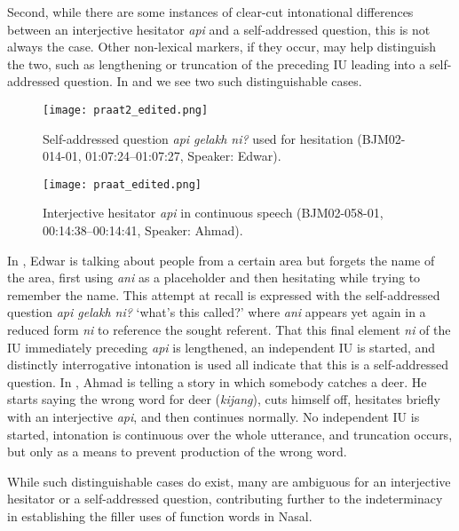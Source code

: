 \documentclass[output=paper,colorlinks,citecolor=brown
\ChapterDOI{10.5281/zenodo.15697585}
]{langscibook}
\begin{document}
Second, while there are some instances of clear-cut intonational differences between an interjective hesitator \textit{api} and a self-addressed question, this is not always the case. Other non-lexical markers, if they occur, may help distinguish the two, such as lengthening or truncation of the preceding IU leading into a self-addressed question. In  and  we see two such distinguishable cases.

        \begin{figure}
            \texttt{[image: praat2\_edited.png]}
            \caption{Self-addressed question \textit{api gelakh ni?} used for hesitation (BJM02-014-01, 01:07:24–01:07:27, Speaker: Edwar).}
            \label{fig:spect-ques}
        \end{figure}
        
        \begin{figure}
            \texttt{[image: praat\_edited.png]}
            \caption{Interjective hesitator \textit{api} in continuous speech (BJM02-058-01, 00:14:38–00:14:41, Speaker: Ahmad).}
            \label{fig:spect-hes}
        \end{figure}

In , Edwar is talking about people from a certain area but forgets the name of the area, first using \textit{ani} as a placeholder and then hesitating while trying to remember the name. This attempt at recall is expressed with the self-addressed question \textit{api gelakh ni?} `what's this called?' where \textit{ani} appears yet again in a reduced form \textit{ni} to reference the sought referent. That this final element \textit{ni} of the IU immediately preceding \textit{api} is lengthened, an independent IU is started, and distinctly interrogative intonation is used all indicate that this is a self-addressed question. In , Ahmad is telling a story in which somebody catches a deer. He starts saying the wrong word for deer (\textit{kijang}), cuts himself off, hesitates briefly with an interjective \textit{api}, and then continues normally. No independent IU is started, intonation is continuous over the whole utterance, and truncation occurs, but only as a means to prevent production of the wrong word.

While such distinguishable cases do exist, many are ambiguous for an interjective hesitator or a self-addressed question, contributing further to the indeterminacy in establishing the filler uses of function words in Nasal.
\end{document}
